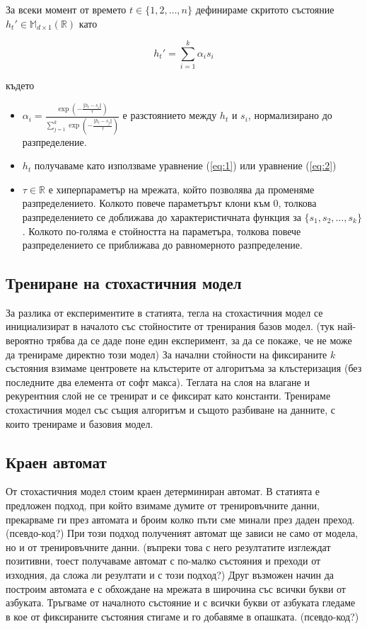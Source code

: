 \documentclass[a4paper,12pt]{article}
\begin{document}
За всеки момент от времето $t \in \{1, 2, \ldots, n\}$ дефинираме скритото състояние $h_t' \in \mathbb{M}_{d \times 1} (\mathbb{R})$ като

\begin{equation}
h_t' = {\sum_{i=1}^{k} \alpha_{i} s_i}
\end{equation}

където

\begin{itemize}
 \item $\alpha_{i} = \frac{\exp \left(- \frac{\Vert{h_t - s_i}\Vert}{\tau}\right)}{\displaystyle\sum_{j=1}^{k} \exp \left(- \frac{\Vert{h_t - s_j}\Vert}{\tau}\right)}$ е разстоянието между $h_t$ и $s_i$, нормализирано до разпределение.
 \item $h_t$ получаваме като използваме уравнение (\ref{eq:1}) или уравнение (\ref{eq:2})
 \item $\tau \in \mathbb{R}$ е хиперпараметър на мрежата, който позволява да променяме разпределението. Колкото повече параметърът клони към 0, толкова разпределението се доближава до характеристичната функция за $\{s_1, s_2, \ldots, s_k\}$. Колкото по-голяма е стойността на параметъра, толкова повече разпределението се приближава до равномерното разпределение.
\end{itemize}


\subsection{Трениране на стохастичния модел}

За разлика от експериментите в статията, тегла на стохастичния модел се инициализират в началото със стойностите от тренирания базов модел. (тук най-вероятно трябва да се даде поне един експеримент, за да се покаже, че не може да тренираме директно този модел) За начални стойности на фиксираните $k$ състояния взимаме центровете на клъстерите от алгоритъма за клъстеризация (без последните два елемента от софт макса). Теглата на слоя на влагане и рекурентния слой не се тренират и се фиксират като константи. Тренираме стохастичния модел със същия алгоритъм и същото разбиване на данните, с които тренираме и базовия модел.

\subsection{Краен автомат}

От стохастичния модел стоим краен детерминиран автомат. В статията \cite{citation06} е предложен подход, при който взимаме думите от тренировъчните данни, прекарваме ги през автомата и броим колко пъти сме минали през даден преход.(псевдо-код?) При този подход полученият автомат ще зависи не само от модела, но и от тренировъчните данни. (въпреки това с него резултатите изглеждат позитивни, тоест получаваме автомат с по-малко състояния и преходи от изходния, да сложа ли резултати и с този подход?)
Друг възможен начин да построим автомата е с обхождане на мрежата в широчина със всички букви от азбуката. Тръгваме от началното състояние и с всички букви от азбуката гледаме в кое от фиксираните състояния стигаме и го добавяме в опашката. (псевдо-код?)
\end{document}
